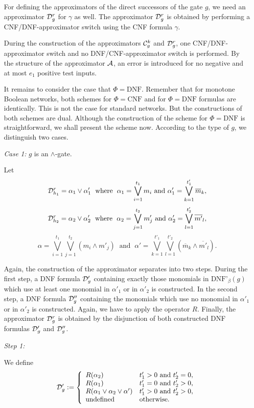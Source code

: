 \documentclass[11pt]{article}
\begin{document}
For defining the approximators of the direct successors of the gate $g$, we need an approximator
${\cal D}_g^r$ for $\gamma$ as well. The approximator ${\cal D}_g^r$ is obtained by performing a
CNF/DNF-approximator switch using the CNF formula $\gamma$. 

\smallskip
During the construction of the approximators ${\cal C}_g^k$ and ${\cal D}_g^r$, one CNF/DNF-approximator switch
and no DNF/CNF-approximator switch is performed.
By the structure of the approximator ${\cal A}$, an error is introduced for no negative and at
most $e_1$ positive test inputs.

\smallskip
It remains to consider the case that $\Phi = \mbox{DNF}$. Remember that for monotone Boolean networks, both
schemes for $\Phi = \mbox{CNF}$ and for $\Phi = \mbox{DNF}$ formulas are identically. This is not the case for
standard networks. But the constructions of both schemes are dual. Although the construction of the scheme for
$\Phi = \mbox{DNF}$ is straightforward, we shall present the scheme now.
According to the type of $g$, we distinguish two cases.

\smallskip
\noindent
{\em Case 1:} $g$ is an $\wedge$-gate.

\smallskip
Let
$$
{\cal D}_{h_1}^r = \alpha_1 \vee \alpha'_1 \; \mbox{ where } \; \alpha_1 = \bigvee_{i=1}^{t_1} m_i \mbox{ and } 
\alpha'_1 =  \bigvee_{k=1}^{t'_1} \overline{m}_k,
$$
$$
{\cal D}_{h_2}^r = \alpha_2 \vee \alpha'_2 \; \mbox{ where } \; \alpha_2 = \bigvee_{j=1}^{t_2} m'_j \mbox{ and }
\alpha'_2 = \bigvee_{l=1}^{t'_2} \overline{m'}_l,
$$
$$
\alpha = \bigvee_{i=1}^{t_1}\bigvee_{j=1}^{t_2} (m_i \wedge m'_j)  \; \mbox{ and } \; 
\alpha' = \bigvee_{k=1}^{t'_1}\bigvee_{l=1}^{t'_2} (\overline{m}_k \wedge \overline{m'}_l).
$$

Again, the construction of the approximator separates into two steps.
During the first step, a DNF formula ${\cal D}'_g$ containing exactly those monomials in $\mbox{DNF'}_{\beta}(g)$
which use at least one monomial in $\alpha'_1$ or in $\alpha'_2$ is constructed. In the second step, a DNF formula
${\cal D}''_g$ containing the monomials which use no monomial in $\alpha'_1$ or in $\alpha'_2$ is constructed. 
Again, we have to apply the operator $R$. Finally, the approximator ${\cal D}_g^r$ is obtained by the disjunction
of both constructed DNF formulas ${\cal D}'_g$ and ${\cal D}''_g$.

\smallskip
\noindent
{\em Step 1:} 

\smallskip
We define
$$
{\cal D}'_g := \left\{ \begin{array}{ll}
                            R(\alpha_2) & t'_1 > 0 \mbox{ and } t'_2 = 0, \\
                            R(\alpha_1) & t'_1 = 0 \mbox{ and } t'_2 > 0, \\ 
                            R(\alpha_1 \vee \alpha_2 \vee \alpha') & t'_1 > 0 \mbox{ and } t'_2 > 0, \\ 
                            \mbox{undefined} & \mbox{otherwise.}
                            \end{array}
\right.
$$
\end{document}
